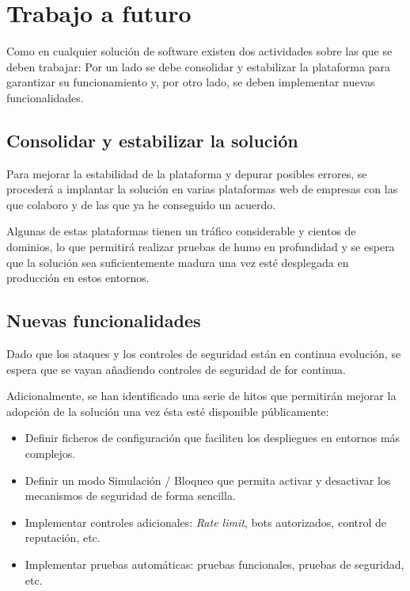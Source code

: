 \section{Trabajo a futuro}
\par Como en cualquier solución de software existen dos actividades sobre las que se deben trabajar: Por un lado se debe consolidar y
estabilizar la plataforma para garantizar su funcionamiento y, por otro lado, se deben implementar nuevas funcionalidades.
\subsection{Consolidar y estabilizar la solución}
\par Para mejorar la estabilidad de la plataforma y depurar posibles errores, se procederá a implantar la solución en varias plataformas web
de empresas con las que colaboro y de las que ya he conseguido un acuerdo.
\par Algunas de estas plataformas tienen un tráfico considerable y cientos de dominios, lo que permitirá realizar pruebas de humo en
profundidad y se espera que la solución sea suficientemente madura una vez esté desplegada en producción en estos entornos.

\subsection{Nuevas funcionalidades}
\par Dado que los ataques y los controles de seguridad están en continua evolución, se espera que se vayan añadiendo controles de seguridad
de for continua.
\par Adicionalmente, se han identificado una serie de hitos que permitirán mejorar la adopción de la solución una vez ésta esté disponible
públicamente:
\begin{itemize}
  \item Definir ficheros de configuración que faciliten los despliegues en entornos más complejos.
  \item Definir un modo Simulación / Bloqueo que permita activar y desactivar los mecanismos de seguridad de forma sencilla.
  \item Implementar controles adicionales: {\em Rate limit}, bots autorizados, control de reputación, etc.
  \item Implementar pruebas automáticas: pruebas funcionales, pruebas de seguridad, etc.
\end{itemize}

